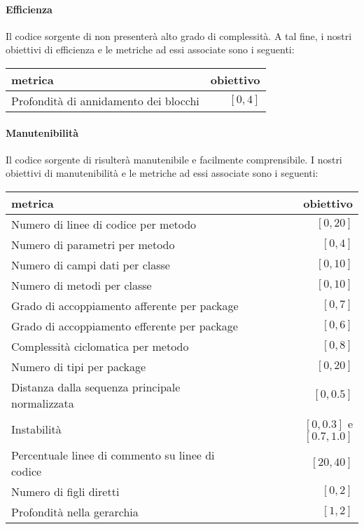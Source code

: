 	\paragraph{Efficienza}
	Il codice sorgente di \proj{} non presenterà alto grado di complessità. A tal fine, i nostri obiettivi di efficienza e le metriche ad essi associate sono i seguenti:
	\begin{center}
	\begin{tabular}{| l | r |}
		\hline
		\textbf{metrica} & \textbf{obiettivo} \\
		\hline
		Profondità di annidamento dei blocchi & $[0, 4]$ \\
		\hline
	\end{tabular}
	\end{center}

	\paragraph{Manutenibilità}
	Il codice sorgente di \proj{} risulterà manutenibile e facilmente comprensibile. I nostri obiettivi di manutenibilità e le metriche ad essi associate sono i seguenti:
	\begin{center}
	\begin{tabular}{| l | r |}
		\hline
		\textbf{metrica} & \textbf{obiettivo} \\
		\hline
		Numero di linee di codice per metodo & $[0, 20]$ \\
		\hline
		Numero di parametri per metodo & $[0, 4]$ \\
		\hline
		Numero di campi dati per classe & $[0, 10]$ \\
		\hline
		Numero di metodi per classe & $[0, 10]$ \\
		\hline
		Grado di accoppiamento afferente per package & $[0, 7]$ \\
		\hline
		Grado di accoppiamento efferente per package & $[0, 6]$ \\
		\hline
		Complessità ciclomatica per metodo & $[0, 8]$ \\
		\hline
		Numero di tipi per package & $[0, 20]$ \\
		\hline
		Distanza dalla sequenza principale normalizzata & $[0, 0.5]$ \\
		\hline
		Instabilità & $[0, 0.3]$ e $[0.7, 1.0]$ \\
		\hline
		Percentuale linee di commento su linee di codice & $[20, 40]$ \\
		\hline
		Numero di figli diretti & $[0, 2]$ \\
		\hline
		Profondità nella gerarchia & $[1, 2]$ \\
		\hline
	\end{tabular}
	\end{center}

